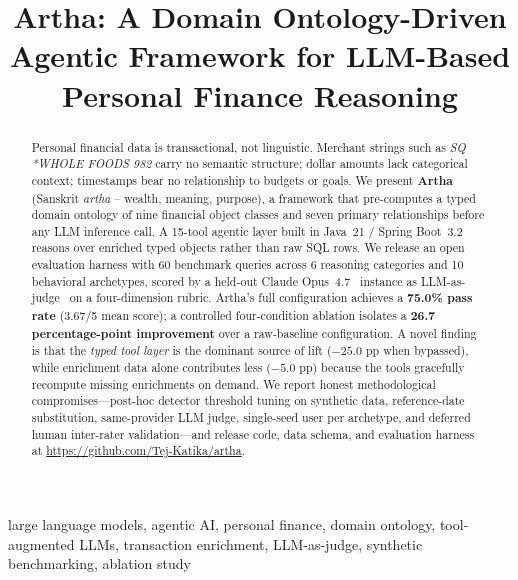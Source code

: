 \documentclass[conference]{IEEEtran}
\begin{document}
\title{Artha: A Domain Ontology-Driven Agentic Framework for
LLM-Based Personal Finance Reasoning}

\author{
}

\maketitle

\begin{abstract}
Personal financial data is transactional, not linguistic. Merchant
strings such as \emph{SQ *WHOLE FOODS 982} carry no semantic
structure; dollar amounts lack categorical context; timestamps bear
no relationship to budgets or goals. We present \textbf{Artha}
(Sanskrit \emph{artha} -- wealth, meaning, purpose), a framework
that pre-computes a typed domain ontology of nine financial object
classes and seven primary relationships before any LLM inference
call. A 15-tool agentic layer built in Java~21 / Spring Boot~3.2
reasons over enriched typed objects rather than raw SQL rows. We
release an open evaluation harness with 60 benchmark queries across
6 reasoning categories and 10 behavioral archetypes, scored by a
held-out Claude Opus~4.7~\cite{claude_opus} instance as
LLM-as-judge~\cite{mtbench} on a four-dimension rubric.
Artha's full configuration achieves a \textbf{75.0\% pass rate}
(3.67/5 mean score); a controlled four-condition ablation isolates a
\textbf{26.7 percentage-point improvement} over a raw-baseline
configuration. A novel finding is that the \emph{typed tool layer}
is the dominant source of lift ($-25.0$ pp when bypassed), while
enrichment data alone contributes less ($-5.0$ pp) because the
tools gracefully recompute missing enrichments on demand. We report
honest methodological compromises---post-hoc detector threshold
tuning on synthetic data, reference-date substitution, same-provider
LLM judge, single-seed user per archetype, and deferred human
inter-rater validation---and release code, data schema, and
evaluation harness at
\url{https://github.com/Tej-Katika/artha}.
\end{abstract}

\begin{IEEEkeywords}
large language models, agentic AI, personal finance, domain
ontology, tool-augmented LLMs, transaction enrichment,
LLM-as-judge, synthetic benchmarking, ablation study
\end{IEEEkeywords}
\end{document}
